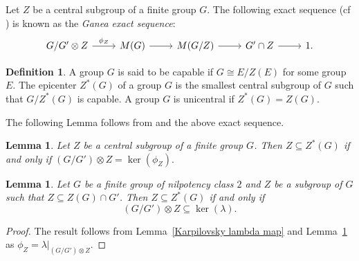 \documentclass[preprint,sort&compress,12pt]{elsarticle}
\newtheorem{lemma}[theorem]{Lemma}
\numberwithin{equation}{section}
\theoremstyle{definition}
\newtheorem{definition}[theorem]{Definition}
\begin{document}
Let \(Z\) be a central subgroup of a finite group \(G\). The following exact sequence (cf  \cite[Theorem 2.5.6] {Karp1987}) is known as the \emph{Ganea exact sequence}:
\[
\begin{tikzcd}
G/G' \otimes Z \arrow[r,"\phi_Z"] &
M(G) \arrow[r] &
M(G/Z) \arrow[r] &
G' \cap Z \arrow[r] &
1.
\end{tikzcd}
\]
\begin{definition} \label{definition: capable, epicenter, unicentral}
    A group $G$ is said to be capable if $G \cong E/Z(E)$ for some group $E$. The epicenter $Z^*(G)$ of a group $G$ is the smallest central subgroup of $G$ such that $G/Z^*(G)$ is capable. A group $G$ is unicentral if $Z^*(G)=Z(G)$.
\end{definition}
The following Lemma follows from \cite[Lemma 4.2]{Beyl1979} and the above exact sequence.
\begin{lemma}\label{capability 1}
Let \(Z\) be a central subgroup of a finite group \(G\).
Then \(Z \subseteq Z^{*}(G)\) if and only if
$(G/G') \otimes Z = \ker(\phi_Z).$
\end{lemma}
\begin{lemma}\label{capability 2}
Let \(G\) be a finite group of nilpotency class \(2\) and \(Z\) be a subgroup
of \(G\) such that \(Z \subseteq Z(G) \cap G'\).
Then \(Z \subseteq Z^{*}(G)\) if and only if
\[
(G/G') \otimes Z \subseteq \ker(\lambda).
\]
\end{lemma}
\begin{proof}
    The result follows from Lemma~\ref{Karpilovsky lambda map} and Lemma~\ref{capability 1} as $\phi_Z=\lambda|_{(G/G') \otimes Z}$. 
\end{proof}
    
\end{document}

